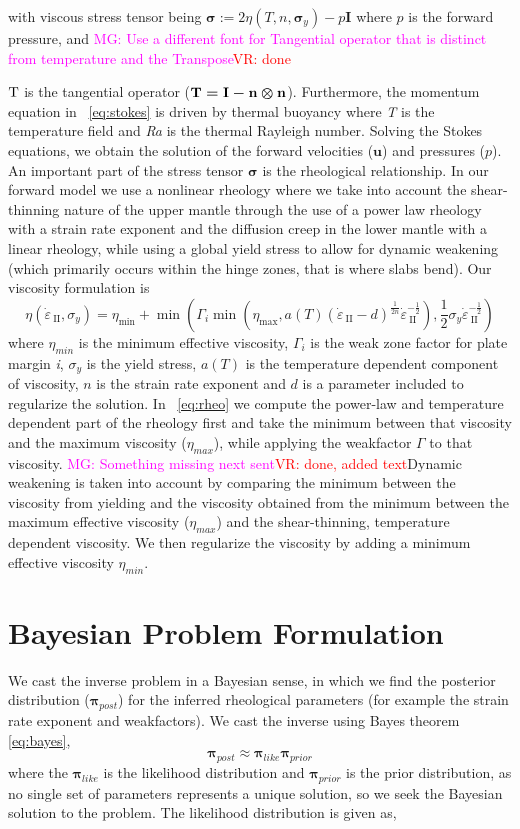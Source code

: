 \documentclass[12pt]{article}
\newcommand{\mgnote}[1]{\textcolor{magenta}{MG: #1}}
\newcommand{\vrnote}[1]{\textcolor{red}{VR: #1}}
\newcommand{\IIinv}{{\dot\varepsilon}_{\mathrm{\!\!\:II}}}
\newcommand{\uu}{{\ensuremath{\boldsymbol{u}}}}
\newcommand{\ppi}{{\ensuremath{\boldsymbol{\pi}}}}
\newcommand{\ssigma}{{\ensuremath{\boldsymbol{\sigma}}}}
\begin{document}
with viscous stress tensor being  $\ssigma := 2\eta(T,n,\ssigma_y)-p\textbf{I}$ where $p$ is the forward pressure, and \mgnote{Use a different font for Tangential operator that is distinct from temperature and the Transpose}\vrnote{done}{$\boldmath{\mathrm{T}}$ is the tangential operator ($\boldmath{\mathrm{T}} = \textbf{I} - \textbf{n} \otimes \textbf{n}$). Furthermore, the momentum equation in ~\eqref{eq:stokes} is driven by thermal buoyancy where \textit{T} is the temperature field and \textit{Ra} is the thermal Rayleigh number. Solving the Stokes equations, we obtain the solution of the forward velocities ($\uu$) and pressures ($p$). An important part of the stress tensor $\ssigma$ is the rheological relationship. In our forward model we use a nonlinear rheology where we take into account the shear-thinning nature of the upper mantle through the use of a power law rheology with a strain rate exponent
and the diffusion creep in the lower mantle with a linear rheology, while using a global yield stress to allow for dynamic weakening (which primarily occurs within the hinge zones, that is where slabs bend). 
Our viscosity formulation is 
\begin{equation}
    \eta(\IIinv,\sigma_{y}) =
\eta_{\min} + \min(\Gamma_i\min(\eta_{\max},a(T)(\IIinv-d)^{\frac{1}{2n}}\IIinv^{-\frac{1}{2}}),
\frac{1}{2}\sigma_y\IIinv^{-\frac{1}{2}})
\label{eq:rheo}
  \end{equation}
where $\eta_{min}$ is the minimum effective viscosity, $\Gamma_i$ is the weak zone factor for plate margin \textit{i}, $\sigma_y$ is the yield stress, $a(T)$ is the temperature dependent component of viscosity, $n$ is the strain rate exponent and $d$ is a parameter included to regularize the solution. In ~\eqref{eq:rheo} we compute the power-law and temperature dependent part of the rheology first and take the minimum between that viscosity and the maximum viscosity ($\eta_{max}$), while applying the weakfactor $\Gamma$ to that viscosity. \mgnote{Something missing next sent}\vrnote{done, added text}Dynamic weakening is taken into account by comparing the minimum between the viscosity from yielding and the viscosity obtained from the minimum between the maximum effective viscosity ($\eta_{max}$) and the shear-thinning, temperature dependent viscosity. We then regularize the viscosity by adding a minimum effective viscosity $\eta_{min}$.

\section{Bayesian Problem Formulation}
We cast the inverse problem in a Bayesian sense, in which we find the posterior distribution ($\ppi_{post}$) for the inferred rheological parameters (for example the strain rate exponent and weakfactors). 
We cast the inverse using Bayes theorem \eqref{eq:bayes},
\begin{equation}
\ppi_{post} \approx \ppi_{like}\ppi_{prior}
\label{eq:bayes}
\end{equation}
where the $\ppi_{like}$ is the likelihood distribution and $\ppi_{prior}$ is the prior distribution, as 
no single set of parameters represents a unique solution, so we seek the Bayesian solution to the problem. The likelihood distribution is given as,

}
\end{document}
